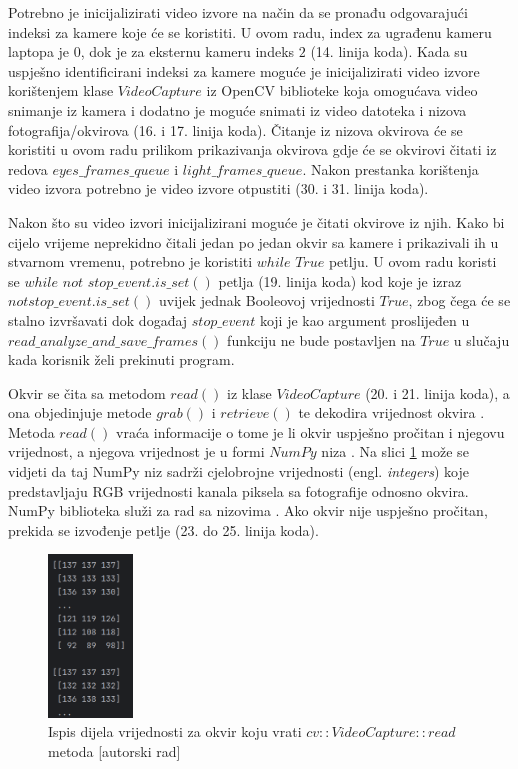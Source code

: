 \documentclass{foi}
\begin{document}
Potrebno je inicijalizirati video izvore na način da se pronađu odgovarajući indeksi za kamere koje će se koristiti. U ovom radu, index za ugrađenu kameru laptopa je $0$, dok je za eksternu kameru indeks $2$ (14. linija koda). Kada su uspješno identificirani indeksi za kamere moguće je inicijalizirati video izvore korištenjem klase $VideoCapture$ iz OpenCV biblioteke koja omogućava video snimanje iz kamera i dodatno je moguće snimati iz video datoteka i nizova fotografija/okvirova \cite{OpenCV2} (16. i 17. linija koda). Čitanje iz nizova okvirova će se koristiti u ovom radu prilikom prikazivanja okvirova gdje će se okvirovi čitati iz redova $eyes\_frames\_queue$ i $light\_frames\_queue$. Nakon prestanka korištenja video izvora potrebno je video izvore otpustiti (30. i 31. linija koda).

Nakon što su video izvori  inicijalizirani moguće je čitati okvirove iz njih. Kako bi cijelo vrijeme neprekidno čitali jedan po jedan okvir sa kamere i prikazivali ih u stvarnom vremenu, potrebno je koristiti $while$ $True$ petlju. U ovom radu koristi se $while$ $not$ $stop\_event.is\_set()$ petlja (19. linija koda) kod koje je izraz $not stop\_event.is\_set()$ uvijek jednak Booleovoj vrijednosti $True$, zbog čega će se stalno izvršavati dok događaj $stop\_event$ koji je kao argument proslijeđen u $read\_analyze\_and\_save\_frames()$ funkciju ne bude postavljen na $True$ u slučaju kada korisnik želi prekinuti program.

Okvir se čita sa metodom $read()$ iz klase $VideoCapture$ (20. i 21. linija koda), a ona objedinjuje metode $grab()$ i $retrieve()$ te dekodira vrijednost okvira \cite{OpenCV2}. Metoda $read()$ vraća informacije o tome je li okvir uspješno pročitan i njegovu vrijednost, a njegova vrijednost je u formi $NumPy$ niza \cite{Reshma2023}. Na slici \ref{fig:ispis_okvira} može se vidjeti da taj NumPy niz sadrži cjelobrojne vrijednosti (engl. \emph{integers}) koje predstavljaju RGB vrijednosti kanala piksela sa fotografije odnosno okvira. NumPy biblioteka služi za rad sa nizovima \cite{NumPy}. Ako okvir nije uspješno pročitan, prekida se izvođenje petlje (23. do 25. linija koda).

\begin{figure}[h!]
    \centering
    \includegraphics[width=0.2\textwidth]{slike/numpy_frame}
    \caption{Ispis dijela vrijednosti za okvir koju vrati $cv::VideoCapture::read$ metoda [autorski rad]}
    \label{fig:ispis_okvira}
\end{figure}
\end{document}
